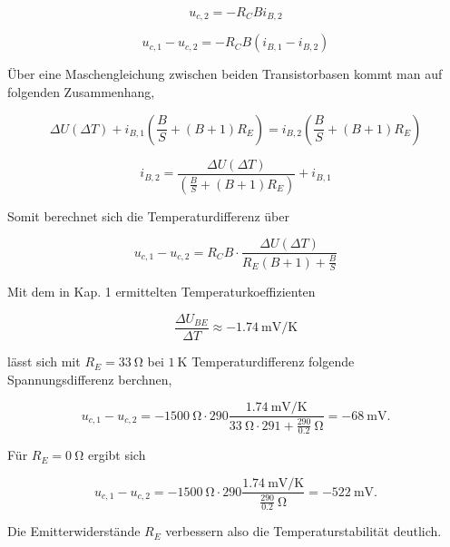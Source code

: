 \begin{equation}
    u_{c,2} = -R_C B i_{B,2}
\end{equation}

\begin{equation}
    u_{c,1} - u_{c,2} = -R_C B ( i_{B,1} - i_{B,2} )
\end{equation}

Über eine Maschengleichung zwischen beiden Transistorbasen kommt man auf folgenden Zusammenhang,

\begin{equation}
    \Delta U(\Delta T) + i_{B,1}(\frac{B}{S} + (B + 1)R_E) = i_{B,2} (\frac{B}{S} + (B + 1)R_E)
\end{equation}

\begin{equation}
    i_{B,2} = \frac{\Delta U(\Delta T)}{(\frac{B}{S} + (B + 1)R_E)} + i_{B,1}
\end{equation}

Somit berechnet sich die Temperaturdifferenz über

\begin{equation}
    u_{c,1} - u_{c,2} = R_C B \cdot \frac{\Delta U(\Delta T)}{R_E(B+1) + \frac{B}{S}}
\end{equation}

Mit dem in Kap. 1 ermittelten Temperaturkoeffizienten 

\begin{equation}
    \frac{\Delta U_{BE}}{\Delta T} \approx -\SI{1,74}{\milli\volt\per\kelvin}
\end{equation}

lässt sich mit $R_E = \SI{33}{\ohm}$ bei $\SI{1}{\kelvin}$ Temperaturdifferenz folgende Spannungsdifferenz berchnen,

\begin{equation}
    u_{c,1} - u_{c,2} = -\SI{1500}{\ohm} \cdot 290  \frac{\SI{1,74}{\milli\volt\per\kelvin}}{\SI{33}{\ohm} \cdot 291 + \frac{290}{0.2}\SI{}{\ohm}} = -\SI{68}{\milli\volt} .
\end{equation}

Für $R_E = \SI{0}{\ohm}$ ergibt sich

\begin{equation}
    u_{c,1} - u_{c,2} = -\SI{1500}{\ohm} \cdot 290  \frac{\SI{1,74}{\milli\volt\per\kelvin}}{\frac{290}{0.2}\SI{}{\ohm}} = -\SI{522}{\milli\volt} .
\end{equation}

Die Emitterwiderstände $R_E$ verbessern also die Temperaturstabilität deutlich.

